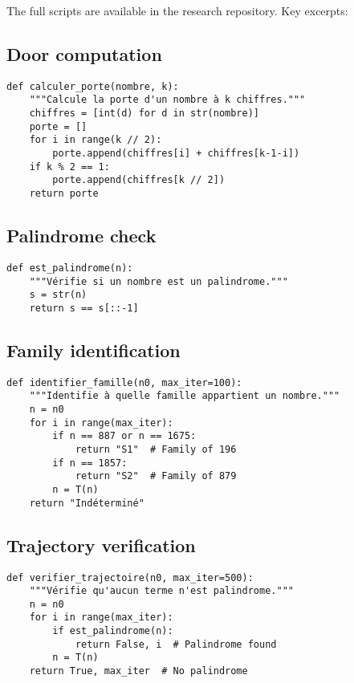 \documentclass[12pt,a4paper]{article}
\theoremstyle{remark}
\begin{document}
The full scripts are available in the research repository. Key excerpts:

\subsection{Door computation}

\begin{verbatim}
def calculer_porte(nombre, k):
    """Calcule la porte d'un nombre à k chiffres."""
    chiffres = [int(d) for d in str(nombre)]
    porte = []
    for i in range(k // 2):
        porte.append(chiffres[i] + chiffres[k-1-i])
    if k % 2 == 1:
        porte.append(chiffres[k // 2])
    return porte
\end{verbatim}

\subsection{Palindrome check}

\begin{verbatim}
def est_palindrome(n):
    """Vérifie si un nombre est un palindrome."""
    s = str(n)
    return s == s[::-1]
\end{verbatim}

\subsection{Family identification}

\begin{verbatim}
def identifier_famille(n0, max_iter=100):
    """Identifie à quelle famille appartient un nombre."""
    n = n0
    for i in range(max_iter):
        if n == 887 or n == 1675:
            return "S1"  # Family of 196
        if n == 1857:
            return "S2"  # Family of 879
        n = T(n)
    return "Indéterminé"
\end{verbatim}

\subsection{Trajectory verification}

\begin{verbatim}
def verifier_trajectoire(n0, max_iter=500):
    """Vérifie qu'aucun terme n'est palindrome."""
    n = n0
    for i in range(max_iter):
        if est_palindrome(n):
            return False, i  # Palindrome found
        n = T(n)
    return True, max_iter  # No palindrome
\end{verbatim}
\end{document}
